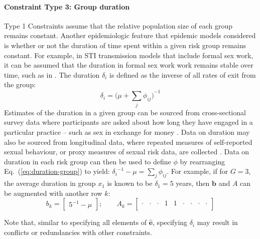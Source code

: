 \paragraph{Constraint Type 3: Group duration}
\label{con:group-dur}
Type 1 Constraints assume that the relative population size of each group remains constant.
Another epidemiologic feature that epidemic models considered
is whether or not the duration of time spent within a given risk group remains constant.
For example, in STI transmission models that include formal sex work,
it can be assumed that the duration in formal sex work work remains stable over time,
such as in \citep{Mishra2014a,Boily2015}.
The duration $\delta_i$ is defined as the inverse of all rates of exit from the group:
\begin{equation}\label{eq:duration-group}
\delta_i = {\bigg(\mu + \sum_{j}{\phi_{ij}}\bigg)}^{-1}
\end{equation}
Estimates of the duration in a given group can be sourced from
cross-sectional survey data where participants are asked about
how long they have engaged in a particular practice
-- such as sex in exchange for money \citep{Watts2010}.
Data on duration may also be sourced from longitudinal data,
where repeated measures of self-reported sexual behaviour,
or proxy measures of sexual risk data,
are collected \citep{DHS,PHIAproject}.
Data on duration in each risk group can then be used to define $\phi$ by
rearranging Eq.~(\ref{eq:duration-group}) to yield:
${\delta_{i}}^{-1} - \mu = \sum_{j}{\phi_{ij}}$.
For example, if for $G = 3$,
the average duration in group $x_1$ is known to be $\delta_1 = 5$ years,
then $\bm{b}$ and $A$ can be augmented with another row $k$:
\begin{equation}\label{eq:eg-dur}
b_k = \left[\begin{array}{c}
{5}^{-1} - \mu
\end{array}\right];\qquad
A_k = \left[\begin{array}{ccccccccc}
\cdot & \cdot & \cdot & 1 & 1 & \cdot & \cdot & \cdot & \cdot \\
\end{array}\right]
\end{equation}
\par
Note that, similar to specifying all elements of $\bm{\hat{e}}$,
specifying $\delta_i$ may result in conflicts or redundancies with other constraints.
